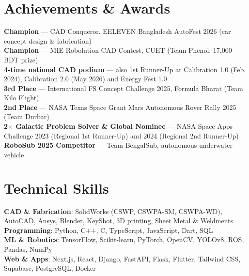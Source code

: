 \documentclass[letterpaper,11pt]{article}
\begin{document}
\section{Achievements \& Awards}
 \begin{itemize}[leftmargin=0.15in, label={}]
    \small{\item{
     \textbf{Champion} --- CAD Conqueror, EELEVEN Bangladesh AutoFest 2026 (car concept design \& fabrication) \\
     \textbf{Champion} --- MIE Robolution CAD Contest, CUET (Team Phenol; 17,000 BDT prize) \\
     \textbf{4-time national CAD podium} --- also 1st Runner-Up at Calibration 1.0 (Feb. 2024), Calibration 2.0 (May 2026) and Energy Fest 1.0 \\
     \textbf{3rd Place} --- International FS Concept Challenge 2025, Formula Bharat (Team Kilo Flight) \\
     \textbf{2nd Place} --- NASA Texas Space Grant Mars Autonomous Rover Rally 2025 (Team Durbar) \\
     \textbf{2$\times$ Galactic Problem Solver \& Global Nominee} --- NASA Space Apps Challenge 2023 (Regional 1st Runner-Up) and 2024 (Regional 2nd Runner-Up) \\
     \textbf{RoboSub 2025 Competitor} --- Team BengalSub, autonomous underwater vehicle
    }}
 \end{itemize}

\section{Technical Skills}
 \begin{itemize}[leftmargin=0.15in, label={}]
    \small{\item{
     \textbf{CAD \& Fabrication}{: SolidWorks (CSWP, CSWPA-SM, CSWPA-WD), AutoCAD, Ansys, Blender, KeyShot, 3D printing, Sheet Metal \& Weldments} \\
     \textbf{Programming}{: Python, C++, C, TypeScript, JavaScript, Dart, SQL} \\
     \textbf{ML \& Robotics}{: TensorFlow, Scikit-learn, PyTorch, OpenCV, YOLOv8, ROS, Pandas, NumPy} \\
     \textbf{Web \& Apps}{: Next.js, React, Django, FastAPI, Flask, Flutter, Tailwind CSS, Supabase, PostgreSQL, Docker}
    }}
 \end{itemize}

\end{document}
